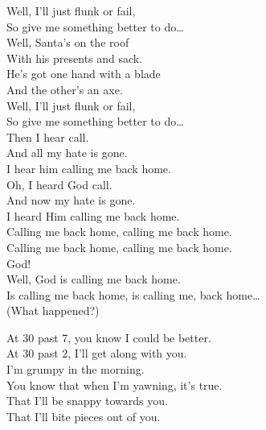 Well, I'll just flunk or fail, \\
So give me something better to do… \\

Well, Santa's on the roof \\
With his presents and sack. \\
He's got one hand with a blade \\
And the other's an axe. \\

Well, I'll just flunk or fail, \\
So give me something better to do… \\

Then I hear  call. \\
And all my hate is gone. \\
I hear him calling me back home. \\

Oh, I heard God call. \\
And now my hate is gone. \\
I heard Him calling me back home. \\

Calling me back home, calling me back home. \\
Calling me back home, calling me back home. \\

God! \\

Well, God is calling me back home. \\
Is calling me back home, is calling me, back home… \\

(What happened?) \\





At 30 past 7, you know I could be better. \\
At 30 past 2, I'll get along with you. \\
I'm grumpy in the morning. \\
You know that when I'm yawning, it's true. \\

That I'll be snappy towards you. \\
That I'll bite pieces out of you. \\

